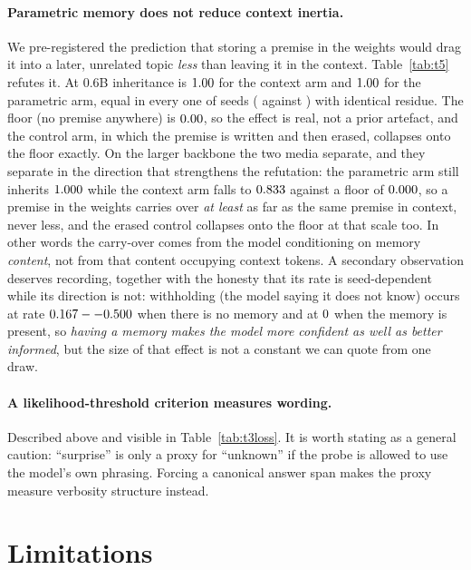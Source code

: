 \documentclass[11pt]{article}
\begin{document}
\paragraph{Parametric memory does not reduce context inertia.} We pre-registered
the prediction that storing a premise in the weights would drag it into a later,
unrelated topic \emph{less} than leaving it in the context. Table~\ref{tab:t5}
refutes it. At 0.6B inheritance is $1.00$ for the context arm and $1.00$ for the
parametric arm, equal in every one of \tSeedsInertia{} seeds (\tContextRange{} against
\tParamRange{}) with identical residue. The floor (no premise anywhere) is $0.00$, so
the effect is real, not a prior artefact, and the control arm, in which the premise
is written and then erased, collapses onto the floor exactly. On the larger backbone the
two media separate, and they separate in the direction that strengthens the refutation:
the parametric arm still inherits $1.000$ while the context arm falls to
$0.833$ against a floor of $0.000$, so a premise in the weights carries
over \emph{at least} as far as the same premise in context, never less, and the erased
control collapses onto the floor at that scale too. In other words the carry-over comes
from the model conditioning on memory
\emph{content}, not from that content occupying context tokens. A secondary
observation deserves recording, together with the honesty that its rate is
seed-dependent while its direction is not: withholding (the model saying it does not
know) occurs at rate $0.167--0.500$ when there is no memory and at
$0$ when the memory is present, so \emph{having a memory makes the model
more confident as well as better informed}, but the size of that effect is not a
constant we can quote from one draw.

\paragraph{A likelihood-threshold criterion measures wording.} Described above
and visible in Table~\ref{tab:t3loss}. It is worth stating as a general caution:
``surprise'' is only a proxy for ``unknown'' if the probe is allowed to use the
model's own phrasing. Forcing a canonical answer span makes the proxy measure
verbosity structure instead.

\section{Limitations}
\label{sec:limits}
\end{document}
